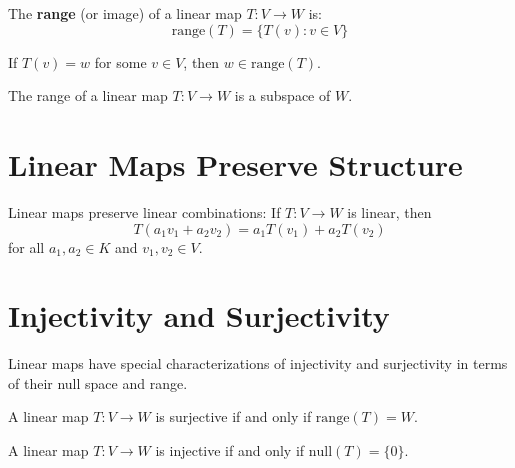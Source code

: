 \begin{definition}
\label{range-def}
The \textbf{range} (or image) of a linear map $T : V \to W$ is:
$$\text{range}(T) = \{T(v) : v \in V\}$$
\end{definition}

\begin{lemma}
\label{mem-range}
If $T(v) = w$ for some $v \in V$, then $w \in \text{range}(T)$.
\end{lemma}

\begin{theorem}
\label{range-subspace}
The range of a linear map $T : V \to W$ is a subspace of $W$.
\end{theorem}

\section{Linear Maps Preserve Structure}

\begin{theorem}
\label{linear-combination-preservation}
Linear maps preserve linear combinations: If $T : V \to W$ is linear, then
$$T(a_1 v_1 + a_2 v_2) = a_1 T(v_1) + a_2 T(v_2)$$
for all $a_1, a_2 \in K$ and $v_1, v_2 \in V$.
\end{theorem}

\section{Injectivity and Surjectivity}

Linear maps have special characterizations of injectivity and surjectivity in terms of their null space and range.

\begin{theorem}
\label{surjective-characterization}
A linear map $T : V \to W$ is surjective if and only if $\text{range}(T) = W$.
\end{theorem}

\begin{theorem}
\label{injective-characterization}
A linear map $T : V \to W$ is injective if and only if $\text{null}(T) = \{0\}$.
\end{theorem}

